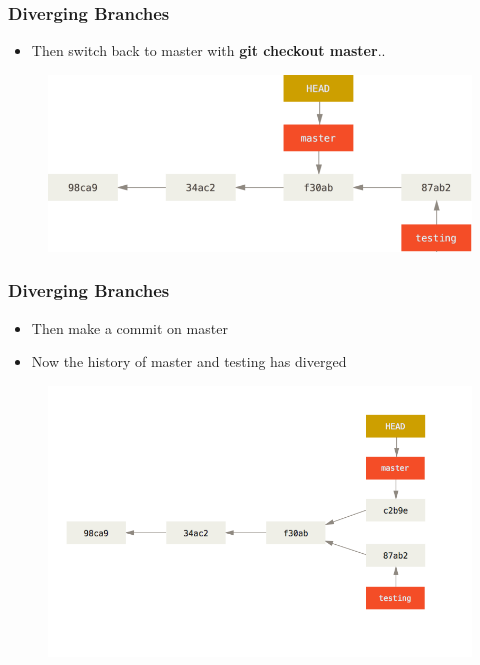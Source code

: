 \documentclass{beamer}
\begin{document}
\begin{frame}
	\frametitle{Diverging Branches}
	\begin{itemize}
		\item{Then switch back to master with \textbf{git checkout master}..}
	\end{itemize}
	\begin{figure}
		\includegraphics[scale=0.4]{Diverging_Branches-1.png}
	\end{figure}
\end{frame}

\begin{frame}
	\frametitle{Diverging Branches}
	\begin{itemize}
		\item{Then make a commit on master}
		\item{Now the history of master and testing has diverged}
	\end{itemize}
	\begin{figure}
		\includegraphics[scale=0.4]{Diverging_Branches-2.png}
	\end{figure}
\end{frame}
\end{document}
